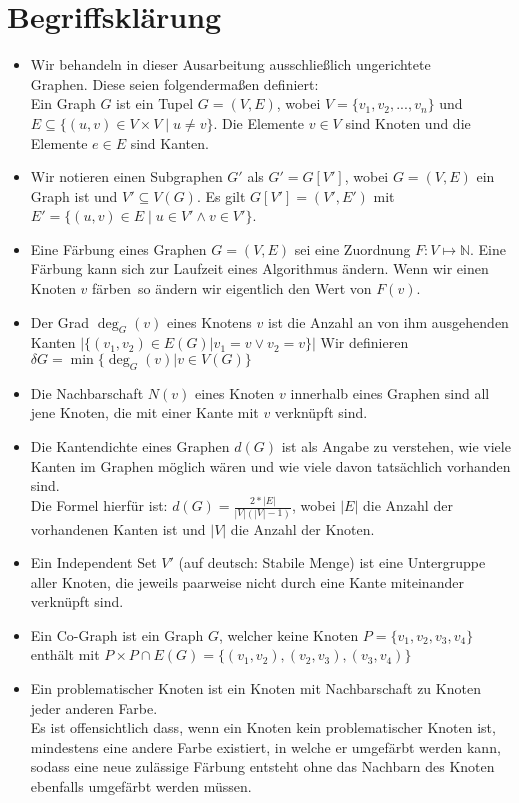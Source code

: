 \documentclass[11pt]{article}
\begin{document}
\section{Begriffsklärung}
\begin{itemize}[noitemsep, left=0pt]
\item Wir behandeln in dieser Ausarbeitung ausschließlich ungerichtete \\Graphen.
Diese seien folgendermaßen definiert:\\
Ein Graph $G$ ist ein Tupel $G=(V,E)$, wobei $V=\{v_1,v_2,...,v_n\}$ und $E\subseteq \{(u,v)\in V\times V \mid u\neq v\}$.
Die Elemente $v\in V$ sind Knoten und die Elemente $e\in E$ sind Kanten.
\item Wir notieren einen Subgraphen $G'$ als 
$G'=G[V']$,
wobei $G=(V,E)$ ein Graph ist und $V'\subseteq V(G)$.
Es gilt $G[V']=(V',E')$ mit $E'=\{(u,v)\in E\mid u\in V'\land v\in V'\}$.
\item Eine Färbung eines Graphen $G=(V,E)$ sei eine Zuordnung $F: V\mapsto \mathbb{N}$. Eine Färbung kann sich zur Laufzeit eines Algorithmus ändern.
Wenn wir einen Knoten $v$ \grqq färben\grqq\ so ändern wir eigentlich den Wert von $F(v)$.
\item Der Grad $\deg_G(v)$ eines Knotens $v$ ist die Anzahl an von ihm ausgehenden Kanten $|\{(v_1,v_2)\in E(G) | v_1=v\lor v_2=v\}|$
Wir definieren $\delta G=\min\{\deg_G(v)|v\in V(G)\}$
\item Die Nachbarschaft $N(v)$ eines Knoten $v$ innerhalb eines Graphen sind all jene Knoten,
die mit einer Kante mit $v$ verknüpft sind.
\item Die Kantendichte eines Graphen $d(G)$ ist als Angabe zu verstehen, wie viele Kanten im Graphen möglich wären und wie viele davon tatsächlich vorhanden sind. \\
Die Formel hierfür ist: $d(G) = \frac{2*|E|}{|V|(|V|-1)}$, wobei $|E|$ die Anzahl der vorhandenen Kanten ist und $|V|$ die Anzahl der Knoten. \\
\item Ein Independent Set $V'$ (auf deutsch: Stabile Menge) ist eine Untergruppe aller Knoten, die jeweils paarweise nicht durch eine
Kante miteinander verknüpft sind.
\item Ein Co-Graph ist ein Graph $G$, welcher keine Knoten $P=\{v_1,v_2,v_3,v_4\}$ enthält mit $P\times P \cap E(G) = \{(v_1,v_2),(v_2,v_3),(v_3,v_4)\}$
\item Ein problematischer Knoten ist ein Knoten mit Nachbarschaft zu Knoten jeder anderen Farbe. \\
Es ist offensichtlich dass, wenn ein Knoten kein problematischer Knoten ist, mindestens eine andere Farbe existiert, in welche er umgefärbt werden kann, \\
sodass eine neue zulässige Färbung entsteht ohne das Nachbarn des Knoten ebenfalls umgefärbt werden müssen.
\end{itemize}
\end{document}
